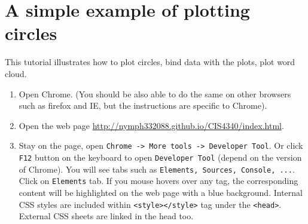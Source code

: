 \documentclass[a4paper, 11pt]{article}
\begin{document}
\section{A simple example of plotting circles}
This tutorial illustrates how to plot circles, bind data with the plots, plot word cloud. 
\begin{enumerate}
\item Open Chrome. (You should be also able to do the same on other browsers such as firefox and IE, but the instructions are specific to Chrome).
\item Open the web page \href{http://nymph332088.github.io/CIS4340/index.html}{http://nymph332088.github.io/CIS4340/index.html}.
\item Stay on the page, open \texttt{Chrome -> More tools -> Developer Tool}. Or click \texttt{F12} button on the keyboard to open \texttt{Developer Tool} (depend on the version of Chrome). You will see tabs such as \texttt{Elements, Sources, Console, ...}. Click on \texttt{Elements} tab. If you mouse hovers over any tag, the corresponding content will be highlighted on the web page with a blue background. Internal CSS styles are included within \texttt{<style></style>} tag under the \texttt{<head>}. External CSS sheets are linked in the head too.


\end{enumerate}
\end{document}
